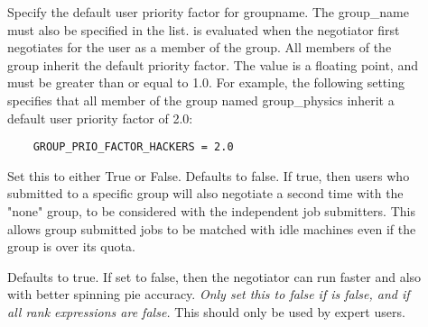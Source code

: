 \begin{description}




\item[]

    Specify the default user priority factor for groupname.  The
    group\_name must also be specified in the 
    list.   is evaluated when
    the negotiator first negotiates for the user as a member of
    the group.  All members of the group inherit the default
    priority factor.  The value is a floating point, and must be
    greater than or equal to 1.0.  For example, the following setting
    specifies that all member of the group named group\_physics
    inherit a default user priority factor of 2.0:
\begin{verbatim}
    GROUP_PRIO_FACTOR_HACKERS = 2.0
\end{verbatim}

\item[]
    Set this to either True or False.  Defaults to
	false.  If true, then users who submitted to a specific group will
	also negotiate a second time with the "none" group, to be
    considered with the independent job submitters. 
	This allows group submitted jobs to be matched with idle machines
	even if the group is over its quota.

\item[]
    Defaults to true.  If set to false, then the negotiator can run
	faster and also with better spinning pie accuracy.  \emph{Only set
	this to false if  is false, and
	if all  rank expressions are false.} This should
	only be used by expert 	users.
\end{description}


